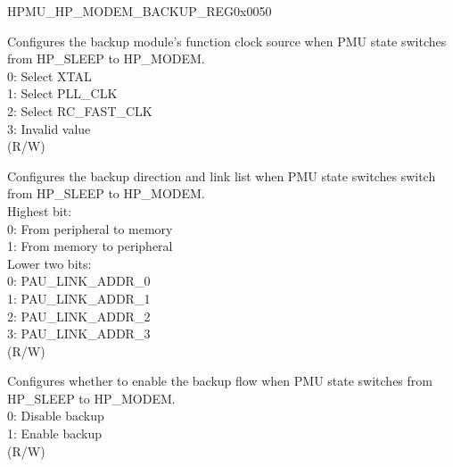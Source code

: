 \begin{register}{H}{PMU\_HP\_MODEM\_BACKUP\_REG}{0x0050}\label{regdesc:PMUHPMODEMBACKUPREG}
%
%
%
%
%
%
%
%
%
\regnewline%
\begin{regdesc}\begin{reglist}
\label{fielddesc:PMUHPSLEEP2MODEMBACKUPCLKSEL}\item [PMU\_HP\_SLEEP2MODEM\_BACKUP\_CLK\_SEL] Configures the backup module's function clock source when PMU state switches from HP\_SLEEP to HP\_MODEM.\\
0: Select XTAL\\
1: Select PLL\_CLK\\
2: Select RC\_FAST\_CLK\\
3: Invalid value\\
(R/W)
\label{fielddesc:PMUHPSLEEP2MODEMBACKUPMODE}\item [PMU\_HP\_SLEEP2MODEM\_BACKUP\_MODE] Configures the backup direction and link list when PMU state switches switch from HP\_SLEEP to HP\_MODEM.\\
Highest bit:\\
0: From peripheral to memory\\
1: From memory to peripheral\\
Lower two bits:\\
0: PAU\_LINK\_ADDR\_0 \\
1: PAU\_LINK\_ADDR\_1 \\
2: PAU\_LINK\_ADDR\_2 \\
3: PAU\_LINK\_ADDR\_3 \\
(R/W)
\label{fielddesc:PMUHPSLEEP2MODEMBACKUPEN}\item [PMU\_HP\_SLEEP2MODEM\_BACKUP\_EN] Configures whether to enable the backup flow when PMU state switches from HP\_SLEEP to HP\_MODEM. \\
0: Disable backup\\
1: Enable backup\\
(R/W)
\end{reglist}\end{regdesc}
\end{register}


